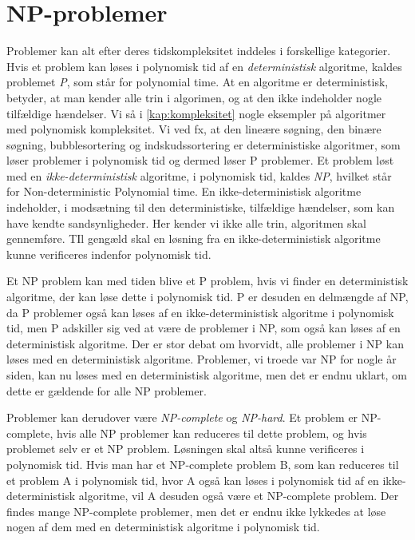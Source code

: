 \section{NP-problemer} \label{kap:np}
Problemer kan alt efter deres tidskompleksitet inddeles i forskellige kategorier. Hvis et problem kan løses i polynomisk tid af en \emph{deterministisk} algoritme, kaldes problemet \emph{P}, som står for polynomial time.
At en algoritme er deterministisk, betyder, at man kender alle trin i algorimen, og at den ikke indeholder nogle tilfældige hændelser. Vi så i \autoref{kap:kompleksitet} nogle eksempler på algoritmer med polynomisk kompleksitet. Vi ved fx, at den lineære søgning, den binære søgning, bubblesortering og indskudssortering er deterministiske algoritmer, som løser problemer i polynomisk tid og dermed løser P problemer. 
Et problem løst med en \emph{ikke-deterministisk} algoritme, i polynomisk tid, kaldes \emph{NP}, hvilket står for Non-deterministic Polynomial time. En ikke-deterministisk algoritme indeholder, i modsætning til den deterministiske, tilfældige hændelser, som kan have kendte sandsynligheder. Her kender vi ikke alle trin, algoritmen skal gennemføre. TIl gengæld skal en løsning fra en ikke-deterministisk algoritme kunne verificeres indenfor polynomisk tid. 

Et NP problem kan med tiden blive et P problem, hvis vi finder en deterministisk algoritme, der kan løse dette i polynomisk tid. P er desuden en delmængde af NP, da P problemer også kan løses af en ikke-deterministisk algoritme i polynomisk tid, men P adskiller sig ved at være de problemer i NP, som også kan løses af en deterministisk algoritme. 
Der er stor debat om hvorvidt, alle problemer i NP kan løses med en deterministisk algoritme. Problemer, vi troede var NP for nogle år siden, kan nu løses med en deterministisk algoritme, men det er endnu uklart, om dette er gældende for alle NP problemer.


Problemer kan derudover være \emph{NP-complete} og \emph{NP-hard}. Et problem er NP-complete, hvis alle NP problemer kan reduceres til dette problem, og hvis problemet selv er et NP problem. Løsningen skal altså kunne verificeres i polynomisk tid. Hvis man har et NP-complete problem B, som kan reduceres til et problem A i polynomisk tid, hvor A også kan løses i polynomisk tid af en ikke-deterministisk algoritme, vil A desuden også være et NP-complete problem. Der findes mange NP-complete problemer, men det er endnu ikke lykkedes at løse nogen af dem med en deterministisk algoritme i polynomisk tid.

